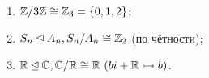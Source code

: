 \begin{examples}\tab
    \begin{enumerate}
        \item $\mathbb{Z} / 3\mathbb{Z} \cong \mathbb{Z}_3 = \{0, 1, 2\}$;
        \item $S_n \unlhd A_n, S_n/A_n \cong \mathbb{Z}_2$ (по чётности);
        \item $\mathbb{R} \unlhd \mathbb{C}, \mathbb{C} / \mathbb{R} \cong \mathbb{R} \ (bi + \mathbb{R} \rightarrowtail b)$. 
    \end{enumerate}
\end{examples}
\setcounter{thcount}{0}
\setcounter{concount}{0}
\setcounter{subthcount}{0}